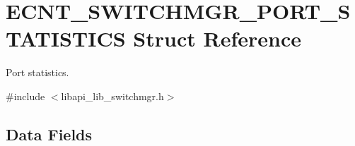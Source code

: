 \hypertarget{structECNT__SWITCHMGR__PORT__STATISTICS}{}\section{E\+C\+N\+T\+\_\+\+S\+W\+I\+T\+C\+H\+M\+G\+R\+\_\+\+P\+O\+R\+T\+\_\+\+S\+T\+A\+T\+I\+S\+T\+I\+CS Struct Reference}
\label{structECNT__SWITCHMGR__PORT__STATISTICS}


Port statistics.  




{\ttfamily \#include $<$libapi\+\_\+lib\+\_\+switchmgr.\+h$>$}

\subsection*{Data Fields}
